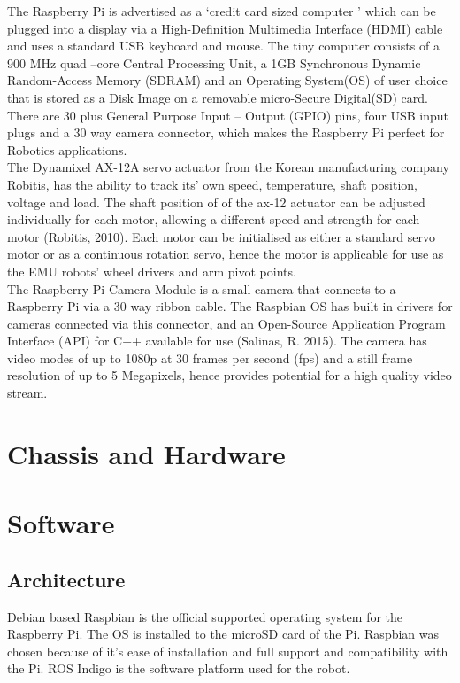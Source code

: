 \documentclass[titlepage,12pt,a4paper]{article}
\begin{document}
\noindent The Raspberry Pi is advertised as a ‘credit card sized computer ’ which can be plugged into a display via a High-Definition Multimedia Interface (HDMI) cable and uses a standard USB keyboard and mouse. The tiny computer consists of a 900 MHz quad –core Central Processing Unit, a 1GB Synchronous Dynamic Random-Access Memory (SDRAM) and an Operating System(OS) of user choice that is stored as a Disk Image on a removable micro-Secure Digital(SD) card. There are 30 plus General Purpose Input – Output (GPIO) pins, four USB input plugs and a 30 way camera connector, which makes the Raspberry Pi perfect for Robotics applications.\\

\noindent The Dynamixel AX-12A servo actuator from the Korean manufacturing company Robitis, has the ability to track its’ own speed, temperature, shaft position, voltage and load. The shaft position of of the ax-12 actuator can be adjusted individually for each motor, allowing a different speed and strength for each motor (Robitis, 2010). Each motor can be initialised as either a standard servo motor or as a continuous rotation servo, hence the motor is applicable for use as the EMU robots’ wheel drivers and arm pivot points.\\

\noindent The Raspberry Pi Camera Module is a small camera that connects to a Raspberry Pi via a 30 way ribbon cable. The Raspbian OS has built in drivers for cameras connected via this connector, and an Open-Source Application Program Interface (API) for C++ available for use (Salinas, R. 2015).  The camera has video modes of up to 1080p at 30 frames per second (fps) and a still frame resolution of up to 5 Megapixels, hence provides potential for a high quality video stream.\\

\section*{Chassis and Hardware}


\section*{Software}
\subsection*{Architecture}
Debian based Raspbian is the official supported operating system for the Raspberry Pi. The OS is installed to the microSD card of the Pi. Raspbian was chosen because of it’s ease of installation and full support and compatibility with the Pi. ROS Indigo is the software platform used for the robot.\\
\end{document}
